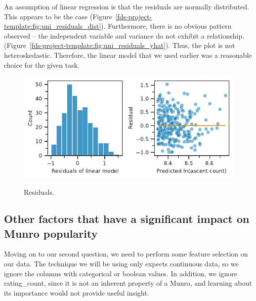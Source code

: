 \documentclass[11pt,a4paper]{article}
\begin{document}
An assumption of linear regression is that the residuals are normally distributed. This appears to be the case (Figure~\ref{fds-project-template:fig:uni_residuals_dist}). Furthermore, there is no obvious pattern observed – the independent variable and variance do not exhibit a relationship. (Figure~\ref{fds-project-template:fig:uni_residuals_yhat}). Thus, the plot is not heteroskedastic. Therefore, the linear model that we used earlier was a reasonable choice for the given task.
\begin{figure} [h!]
  \centering
  \includegraphics{report/uni_residuals.pdf}
  \begin{minipage}[t]{.5\linewidth}
        \centering
        \label{fds-project-template:fig:uni_residuals_yhat}
    \end{minipage}%
    \begin{minipage}[t]{.5\linewidth}
        \centering
        \label{fds-project-template:fig:uni_residuals_dist}
    \end{minipage}
  \caption{Residuals.}
  \label{fds-project-template:fig:uni_residuals}
\end{figure}
\subsection{Other factors that have a significant impact on Munro popularity}

Moving on to our second question, we need to perform some feature selection on our data. The technique we will be using only expects continuous data, so we ignore the columns with categorical or boolean values. In addition, we ignore rating\_count, since it is not an inherent property of a Munro, and learning about its importance would not provide useful insight.
\end{document}

